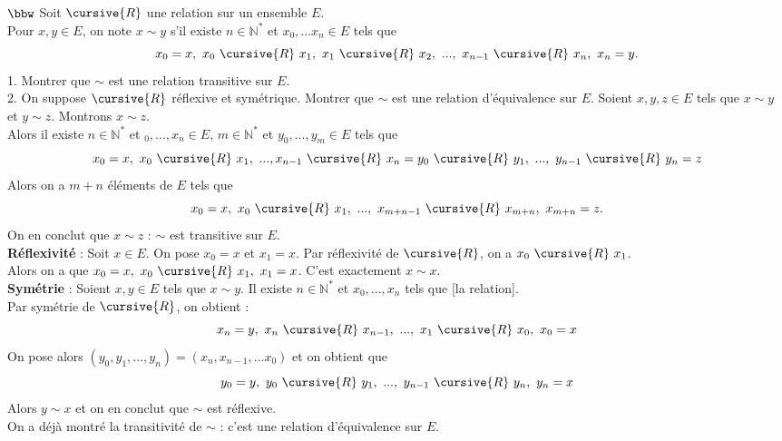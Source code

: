 \documentclass[11pt]{article}
\renewcommand*{\r}{\cursive{R}}
\begin{document}
\begin{exercice}{$\bbw$}{}
    Soit $\r$ une relation sur un ensemble $E$.\\
    Pour $x,y\in E$, on note $x \sim y$ s'il existe $n\in\mathbb{N}^*$ et $x_0,...x_n \in E$ tels que
    \begin{equation*}
        x_0 = x, ~ x_0 ~ \r ~ x_1, ~ x_1 ~ \r ~ x_2, ~ ..., ~ x_{n-1} ~ \r ~ x_n, ~ x_n = y.
    \end{equation*}
    1. Montrer que $\sim$ est une relation transitive sur $E$.\\
    2. On suppose $\r$ réflexive et symétrique. Montrer que $\sim$ est une relation d'équivalence sur $E$.
    \tcblower
     Soient $x,y,z\in E$ tels que $x \sim y$ et $y \sim z$. Montrons $x \sim z$.\\
    Alors il existe $n \in \mathbb{N}^*$ et $_0,...,x_n\in E$, $m \in \mathbb{N}^*$ et $y_0,...,y_m\in E$ tels que
    \begin{equation*}
        x_0 = x, ~ x_0 ~ \r ~ x_1, ~..., x_{n-1} ~ \r ~ x_n = y_0 ~ \r ~ y_1, ~...,~y_{n-1} ~ \r ~y_n=z
    \end{equation*}
    Alors on a $m+n$ éléments de $E$ tels que
    \begin{equation*}
        x_0 = x, ~ x_0 ~ \r ~ x_1, ~ ..., ~ x_{m+n-1} ~ \r ~x_{m+n}, ~ x_{m+n} = z. 
    \end{equation*}
    On en conclut que $x \sim z$ : $\sim$ est transitive sur $E$.\\[0.15cm]
    \textbf{Réflexivité} : Soit $x \in E$. On pose $x_0 = x$ et $x_1 = x$. Par réflexivité de $\r$, on a $x_0 ~ \r ~ x_1$.\\
    Alors on a que $x_0 = x, ~ x_0 ~ \r ~ x_1, ~ x_1 = x$. C'est exactement $x \sim x$.\\[0.15cm]
    \textbf{Symétrie} : Soient $x,y\in E$ tels que $x \sim y$. Il existe $n\in\mathbb{N}^*$ et $x_0,...,x_n$ tels que [la relation].\\
    Par symétrie de $\r$, on obtient :
    \begin{equation*}
        x_n = y, ~ x_{n} ~ \r ~ x_{n-1}, ~ ..., ~ x_1 ~ \r ~ x_0, ~ x_0 = x 
    \end{equation*}
    On pose alors $(y_0, y_1, ..., y_n) = (x_n, x_{n-1}, ... x_0)$ et on obtient que
    \begin{equation*}
        y_0 = y, ~ y_0 ~ \r ~ y_{1}, ~ ..., ~ y_{n-1} ~ \r ~ y_n, ~ y_n = x
    \end{equation*}
    Alors $y \sim x$ et on en conclut que $\sim$ est réflexive.\\
    On a déjà montré la transitivité de $\sim$ : c'est une relation d'équivalence sur $E$.
\end{exercice}
\end{document}
